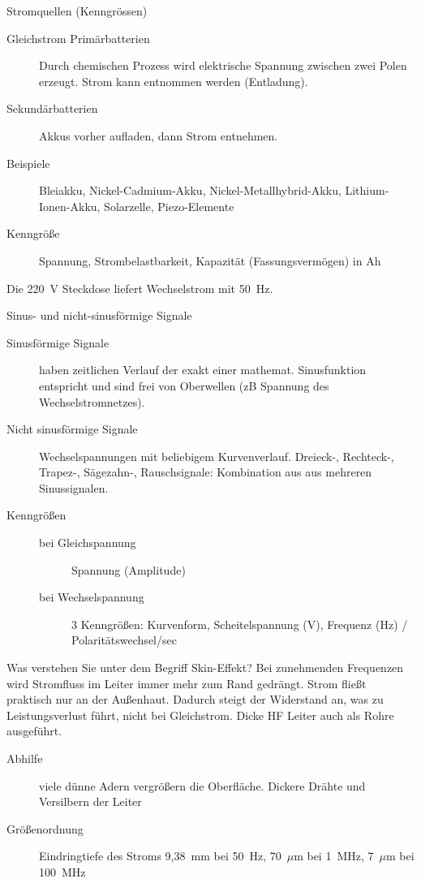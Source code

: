 \documentclass[avery5371,grid,frame,a4paper]{flashcards}
\newcommand{\card}[3]{
  \begin{flashcard}[{\chap} -- #1]{#2}#3\end{flashcard}
}
\begin{document}
\card{06}{Stromquellen (Kenngrössen)}{
  \footnotesize
  \begin{description}
    \item[Gleichstrom Primärbatterien] Durch chemischen Prozess wird elektrische Spannung zwischen zwei Polen erzeugt. Strom kann entnommen werden (Entladung).
    \item[Sekundärbatterien] Akkus vorher aufladen, dann Strom entnehmen.
    \item[Beispiele]
      Bleiakku, Nickel-Cadmium-Akku, Nickel-Metallhybrid-Akku, Lithium-Ionen-Akku,
      Solarzelle, Piezo-Elemente
    \item[Kenngröße] Spannung, Strombelastbarkeit, Kapazität (Fassungsvermögen) in Ah
  \end{description}
  Die 220~V Steckdose liefert Wechselstrom mit 50~Hz.
}

\card{07}{Sinus- und nicht-sinusförmige Signale}{
  \footnotesize
  \begin{description}
    \item[Sinusförmige Signale] haben zeitlichen Verlauf der exakt einer mathemat. Sinusfunktion entspricht und sind frei von Oberwellen (zB Spannung des Wechselstromnetzes).
    \item[Nicht sinusförmige Signale]
      Wechselspannungen mit beliebigem Kurvenverlauf.
      Dreieck-, Rechteck-, Trapez-, Sägezahn-, Rauschsignale: Kombination aus aus mehreren Sinussignalen.
    \item[Kenngrößen]
      \begin{description}
        \item[bei Gleichspannung] Spannung (Amplitude)
        \item[bei Wechselspannung] 3 Kenngrößen: Kurvenform, Scheitelspannung (V), Frequenz (Hz) / Polaritätswechsel/sec
      \end{description}
  \end{description}
}

\card{08}{Was verstehen Sie unter dem Begriff Skin-Effekt?}{
  \small
  Bei zunehmenden Frequenzen wird Stromfluss im Leiter immer mehr zum Rand gedrängt.
  Strom fließt praktisch nur an der Außenhaut.
  Dadurch steigt der Widerstand an, was zu Leistungsverlust führt, nicht bei Gleichstrom.
  Dicke HF Leiter auch als Rohre ausgeführt.
  \begin{description}
    \item[Abhilfe] viele dünne Adern vergrößern die Oberfläche. Dickere Drähte und Versilbern der Leiter
    \item[Größenordnung] Eindringtiefe des Stroms
      9,38~mm bei 50~Hz, 70~$\mu$m bei 1~MHz, 7~$\mu$m bei 100~MHz
  \end{description}
}
\end{document}
